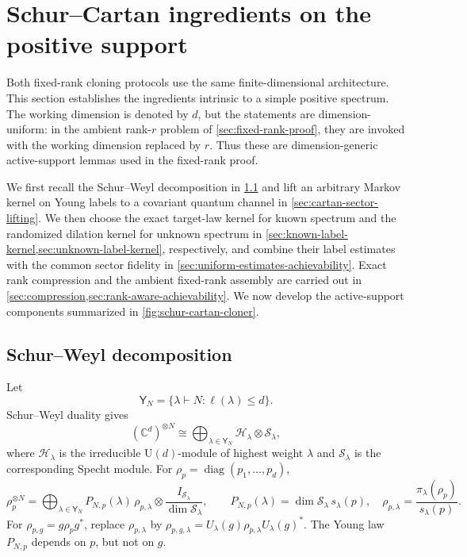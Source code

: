 \documentclass[11pt]{article}
\theoremstyle{remark}
\theoremstyle{plain}
\newcommand{\C}{\mathbb C}
\newcommand{\cH}{\mathcal H}
\newcommand{\cS}{\mathcal S}
\newcommand{\U}{\mathrm U}
\newcommand{\diag}{\operatorname{diag}}
\newcommand{\ot}{\otimes}
\begin{document}
\section{Schur--Cartan ingredients on the positive support}
\label{sec:label-kernels}

Both fixed-rank cloning protocols use the same finite-dimensional
architecture.  This section establishes the ingredients intrinsic to a
simple positive spectrum.  The working dimension is denoted by \(d\), but
the statements are dimension-uniform: in the ambient rank-\(r\) problem of
\cref{sec:fixed-rank-proof}, they are invoked with the working dimension
replaced by \(r\).  Thus these are dimension-generic active-support lemmas
used in the fixed-rank proof.

We first recall the Schur--Weyl decomposition in
\cref{sec:schur-weyl-decomposition} and lift an arbitrary Markov kernel on
Young labels to a covariant quantum channel in
\cref{sec:cartan-sector-lifting}.  We then choose the exact target-law kernel
for known spectrum and the randomized dilation kernel for unknown spectrum in
\cref{sec:known-label-kernel,sec:unknown-label-kernel}, respectively, and
combine their label estimates with the common sector fidelity in
\cref{sec:uniform-estimates-achievability}.  Exact rank compression and the
ambient fixed-rank assembly are carried out in
\cref{sec:compression,sec:rank-aware-achievability}.  We now develop the
active-support components summarized in
\cref{fig:schur-cartan-cloner}.

\subsection{Schur--Weyl decomposition}
\label{sec:schur-weyl-decomposition}

Let
\[
  \mathsf Y_N=\{\lambda\vdash N:\ell(\lambda)\le d\}.
\]
Schur--Weyl duality gives
\[
  (\C^d)^{\ot N}
  \cong
  \bigoplus_{\lambda\in\mathsf Y_N}\cH_\lambda\ot\cS_\lambda,
\]
where \(\cH_\lambda\) is the irreducible \(\U(d)\)-module of highest
weight \(\lambda\) and \(\cS_\lambda\) is the corresponding Specht module.
For \(\rho_p=\diag(p_1,\ldots,p_d)\),
\begin{equation}\label{eq:schur-state}
  \rho_p^{\ot N}
  =\bigoplus_{\lambda\in\mathsf Y_N}
  P_{N,p}(\lambda)\,
  \rho_{p,\lambda}\ot\frac{I_{\cS_\lambda}}{\dim\cS_\lambda},
  \qquad
  P_{N,p}(\lambda)=\dim\cS_\lambda\,s_\lambda(p),
  \quad
  \rho_{p,\lambda}=\frac{\pi_\lambda(\rho_p)}{s_\lambda(p)}.
\end{equation}
For \(\rho_{p,g}=g\rho_p g^*\), replace \(\rho_{p,\lambda}\) by
\(\rho_{p,g,\lambda}=U_\lambda(g)\rho_{p,\lambda}U_\lambda(g)^*\).  The
Young law \(P_{N,p}\) depends on \(p\), but not on \(g\).
\end{document}
